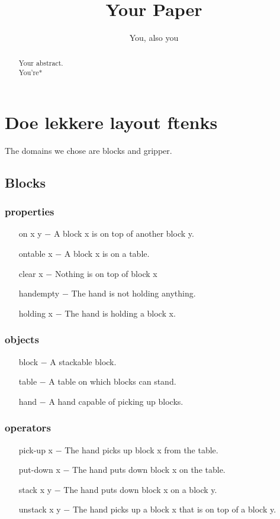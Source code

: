 \documentclass[a4paper]{article}
\title{Your Paper}
\author{You, also you}
\begin{document}
\maketitle

\begin{abstract}
Your abstract.\\
You're*
\end{abstract}

\section{Doe lekkere layout ftenks}
The domains we chose are blocks and gripper.

\subsection*{Blocks}
\subsubsection*{properties}
\begin{itemize}
\item[on x y $-$] A block x is on top of another block y.
\item[ontable x $-$] A block x is on a table.
\item[clear x $-$] Nothing is on top of block x
\item[handempty $-$] The hand is not holding anything.
\item[holding x $-$] The hand is holding a block x.
\end{itemize}
\subsubsection*{objects}
\begin{itemize}
\item [block $-$] A stackable block.
\item [table $-$] A table on which blocks can stand.
\item [hand $-$] A hand capable of picking up blocks.

\end{itemize}

\subsubsection*{operators}
\begin{itemize}
\item [pick-up x $-$] The hand picks up block x from the table.
\item [put-down x $-$] The hand puts down block x on the table.
\item [stack x y $-$] The hand puts down block x on a block y.
\item [unstack x y $-$] The hand picks up a block x that is on top of a block y.
\end{itemize}
\end{document}

